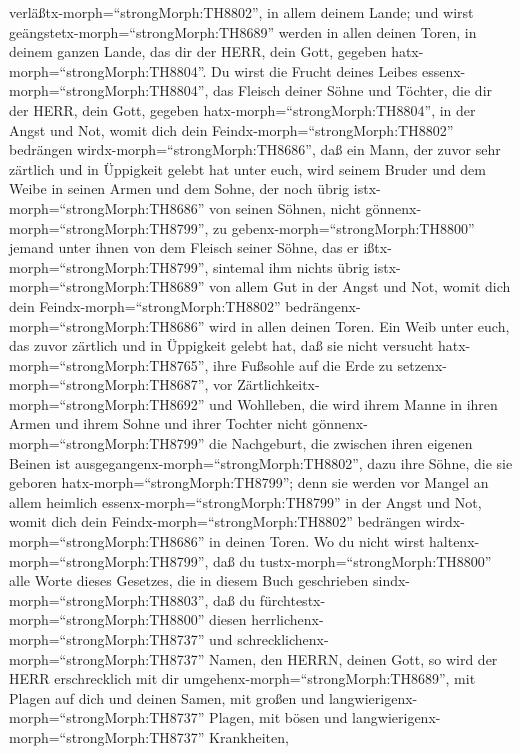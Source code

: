 verläßtx-morph=``strongMorph:TH8802'', in allem deinem Lande; und wirst
geängstetx-morph=``strongMorph:TH8689'' werden in allen deinen Toren, in
deinem ganzen Lande, das dir der HERR, dein Gott, gegeben
hatx-morph=``strongMorph:TH8804''.  Du wirst die Frucht
deines Leibes essenx-morph=``strongMorph:TH8804'', das Fleisch deiner
Söhne und Töchter, die dir der HERR, dein Gott, gegeben
hatx-morph=``strongMorph:TH8804'', in der Angst und Not, womit dich dein
Feindx-morph=``strongMorph:TH8802'' bedrängen
wirdx-morph=``strongMorph:TH8686'',  daß ein Mann, der
zuvor sehr zärtlich und in Üppigkeit gelebt hat unter euch, wird seinem
Bruder und dem Weibe in seinen Armen und dem Sohne, der noch übrig
istx-morph=``strongMorph:TH8686'' von seinen Söhnen, nicht
gönnenx-morph=``strongMorph:TH8799'',  zu
gebenx-morph=``strongMorph:TH8800'' jemand unter ihnen von dem Fleisch
seiner Söhne, das er ißtx-morph=``strongMorph:TH8799'', sintemal ihm
nichts übrig istx-morph=``strongMorph:TH8689'' von allem Gut in der
Angst und Not, womit dich dein Feindx-morph=``strongMorph:TH8802''
bedrängenx-morph=``strongMorph:TH8686'' wird in allen deinen Toren.
 Ein Weib unter euch, das zuvor zärtlich und in Üppigkeit
gelebt hat, daß sie nicht versucht hatx-morph=``strongMorph:TH8765'',
ihre Fußsohle auf die Erde zu setzenx-morph=``strongMorph:TH8687'', vor
Zärtlichkeitx-morph=``strongMorph:TH8692'' und Wohlleben, die wird ihrem
Manne in ihren Armen und ihrem Sohne und ihrer Tochter nicht
gönnenx-morph=``strongMorph:TH8799''  die Nachgeburt, die
zwischen ihren eigenen Beinen ist
ausgegangenx-morph=``strongMorph:TH8802'', dazu ihre Söhne, die sie
geboren hatx-morph=``strongMorph:TH8799''; denn sie werden vor Mangel an
allem heimlich essenx-morph=``strongMorph:TH8799'' in der Angst und Not,
womit dich dein Feindx-morph=``strongMorph:TH8802'' bedrängen
wirdx-morph=``strongMorph:TH8686'' in deinen Toren.  Wo du
nicht wirst haltenx-morph=``strongMorph:TH8799'', daß du
tustx-morph=``strongMorph:TH8800'' alle Worte dieses Gesetzes, die in
diesem Buch geschrieben sindx-morph=``strongMorph:TH8803'', daß du
fürchtestx-morph=``strongMorph:TH8800'' diesen
herrlichenx-morph=``strongMorph:TH8737'' und
schrecklichenx-morph=``strongMorph:TH8737'' Namen, den HERRN, deinen
Gott,  so wird der HERR erschrecklich mit dir
umgehenx-morph=``strongMorph:TH8689'', mit Plagen auf dich und deinen
Samen, mit großen und langwierigenx-morph=``strongMorph:TH8737'' Plagen,
mit bösen und langwierigenx-morph=``strongMorph:TH8737'' Krankheiten,

